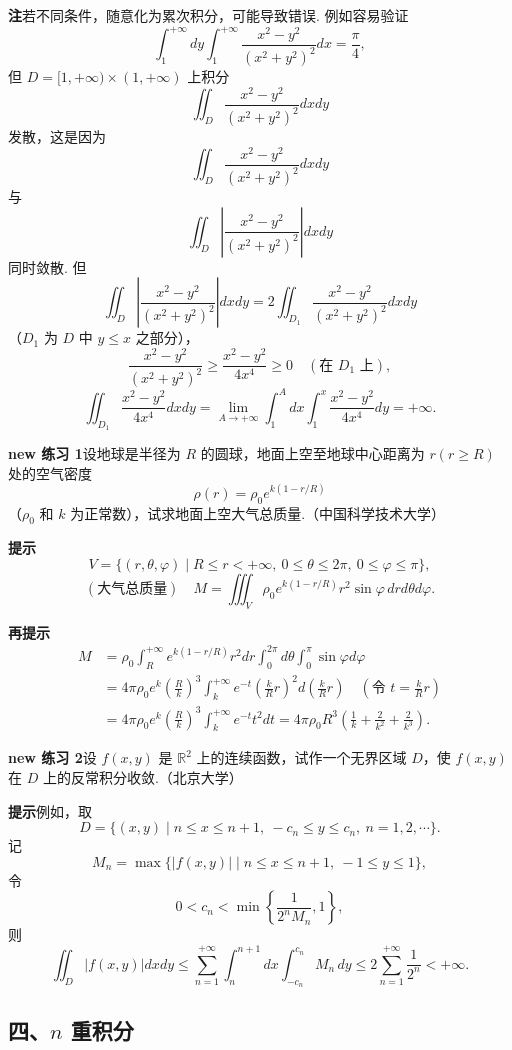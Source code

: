 \documentclass[UTF8,12pt,a4paper,fontset=fandol]{ctexart}
\begin{document}
\noindent\textbf{注}\quad 若不同条件，随意化为累次积分，可能导致错误. 例如容易验证
\[
\int_1^{+\infty}dy\int_1^{+\infty}\frac{x^2-y^2}{(x^2+y^2)^2}dx=\frac\pi4,
\]
但 $D=[1,+\infty)\times(1,+\infty)$ 上积分
\[
\iint_D\frac{x^2-y^2}{(x^2+y^2)^2}dxdy
\]
发散，这是因为
\[
\iint_D\frac{x^2-y^2}{(x^2+y^2)^2}dxdy
\]
与
\[
\iint_D\left|\frac{x^2-y^2}{(x^2+y^2)^2}\right|dxdy
\]
同时敛散. 但
\[
\iint_D\left|\frac{x^2-y^2}{(x^2+y^2)^2}\right|dxdy
=2\iint_{D_1}\frac{x^2-y^2}{(x^2+y^2)^2}dxdy
\]
（$D_1$ 为 $D$ 中 $y\le x$ 之部分），
\[
\frac{x^2-y^2}{(x^2+y^2)^2}\ge\frac{x^2-y^2}{4x^4}\ge0\quad(\text{在 }D_1\text{ 上}),
\]
\[
\iint_{D_1}\frac{x^2-y^2}{4x^4}dxdy
=\lim_{A\to+\infty}\int_1^A dx\int_1^x
\frac{x^2-y^2}{4x^4}dy=+\infty.
\]

\noindent\textbf{new 练习 1}\quad 设地球是半径为 $R$ 的圆球，地面上空至地球中心距离为 $r(r\ge R)$ 处的空气密度
\[
\rho(r)=\rho_0e^{k(1-r/R)}
\]
（$\rho_0$ 和 $k$ 为正常数），试求地面上空大气总质量.（中国科学技术大学）

\noindent\textbf{提示}\quad
\[
V=\{(r,\theta,\varphi)\mid R\le r<+\infty,\ 0\le\theta\le2\pi,\ 0\le\varphi\le\pi\},
\]
\[
(\text{大气总质量})\quad
M=\iiint_V\rho_0e^{k(1-r/R)}r^2\sin\varphi\,drd\theta d\varphi.
\]

\noindent\textbf{再提示}\quad
\[
\begin{aligned}
M&=\rho_0\int_R^{+\infty}e^{k(1-r/R)}r^2dr\int_0^{2\pi}d\theta\int_0^\pi\sin\varphi d\varphi\\
&=4\pi\rho_0e^k\left(\frac Rk\right)^3
\int_k^{+\infty}e^{-t}\left(\frac{k}{R}r\right)^2d\left(\frac{k}{R}r\right)\quad
\left(\text{令 }t=\frac{k}{R}r\right)\\
&=4\pi\rho_0e^k\left(\frac Rk\right)^3
\int_k^{+\infty}e^{-t}t^2dt
=4\pi\rho_0R^3\left(\frac1k+\frac2{k^2}+\frac2{k^3}\right).
\end{aligned}
\]

\noindent\textbf{new 练习 2}\quad 设 $f(x,y)$ 是 $\mathbb R^2$ 上的连续函数，试作一个无界区域 $D$，使 $f(x,y)$ 在 $D$ 上的反常积分收敛.（北京大学）

\noindent\textbf{提示}\quad 例如，取
\[
D=\{(x,y)\mid n\le x\le n+1,\ -c_n\le y\le c_n,\ n=1,2,\cdots\}.
\]
记
\[
M_n=\max\{|f(x,y)|\mid n\le x\le n+1,\ -1\le y\le1\},
\]
令
\[
0<c_n<\min\left\{\frac1{2^nM_n},1\right\},
\]
则
\[
\iint_D|f(x,y)|dxdy
\le\sum_{n=1}^{+\infty}\int_n^{n+1}dx\int_{-c_n}^{c_n}M_n\,dy
\le2\sum_{n=1}^{+\infty}\frac1{2^n}<+\infty.
\]

\subsection*{四、$n$ 重积分}
\end{document}
